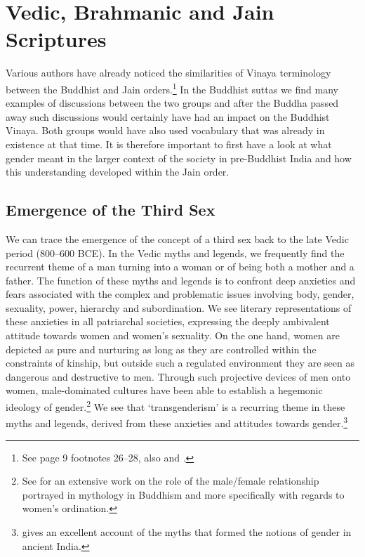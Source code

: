 \section{Vedic, Brahmanic and Jain Scriptures}

Various authors have already noticed the similarities of Vinaya terminology between the Buddhist and Jain orders.\footnote{See \cite{maes2016} page 9 footnotes 26–28, also \cite{sujato2009} and \cite{zwilling}.} In the Buddhist suttas we find many examples of discussions between the two groups and after the Buddha passed away such discussions would certainly have had an impact on the Buddhist Vinaya. Both groups would have also used vocabulary that was already in existence at that time. It is therefore important to first have a look at what gender meant in the larger context of the society in pre-Buddhist India and how this understanding developed within the Jain order.

\subsection{Emergence of the Third Sex}
We can trace the emergence of the concept of a third sex back to the late Vedic period (800–600 BCE). In the Vedic myths and legends, we frequently find the recurrent theme of a man turning into a woman or of being both a mother and a father. The function of these myths and legends is to confront deep anxieties and fears associated with the complex and problematic issues involving body, gender, sexuality, power, hierarchy and subordination. We see literary representations of these anxieties in all patriarchal societies, expressing the deeply ambivalent attitude towards women and women's sexuality. On the one hand, women are depicted as pure and nurturing as long as they are controlled within the constraints of kinship, but outside such a regulated environment they are seen as dangerous and destructive to men. Through such projective devices of men onto women, male-dominated cultures have been able to establish a hegemonic ideology of gender.\footnote{See \cite{sujato2011} for an extensive work on the role of the male/female relationship portrayed in mythology in Buddhism and more specifically with regards to women's ordination.} We see that `transgenderism' is a recurring theme in these myths and legends, derived from these anxieties and attitudes towards gender.\footnote{\cite{goldman} gives an excellent account of the myths that formed the notions of gender in ancient India.}

